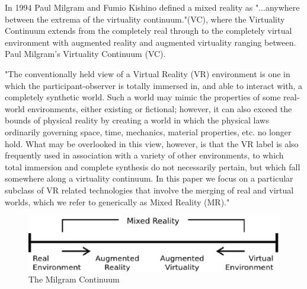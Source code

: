 In 1994 Paul Milgram and Fumio Kishino defined a mixed reality as "...anywhere between the extrema of the virtuality continuum."(VC), where the Virtuality Continuum extends from the completely real through to the completely virtual environment with augmented reality and augmented virtuality ranging between.
Paul Milgram's Virtuality Continuum (VC).

"The conventionally held view of a Virtual Reality (VR) environment is one in which the participant-observer is totally immersed in, and able to interact with, a completely synthetic world. Such a world may mimic the properties of some real-world environments, either existing or fictional; however, it can also exceed the bounds of physical reality by creating a world in which the physical laws ordinarily governing space, time, mechanics, material properties, etc. no longer hold. What may be overlooked in this view, however, is that the VR label is also frequently used in association with a variety of other environments, to which total immersion and complete synthesis do not necessarily pertain, but which fall somewhere along a virtuality continuum. In this paper we focus on a particular subclass of VR related technologies that involve the merging of real and virtual worlds, which we refer to generically as Mixed Reality (MR)."

\begin{figure}
\centering
\includegraphics[bb=0 0 420 90,scale=0.8]{Millee.ps}
\caption{The Milgram Continuum}
\end{figure}

